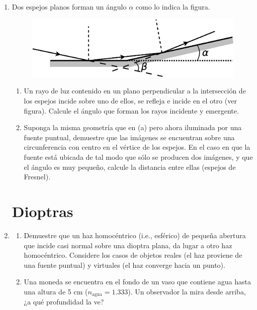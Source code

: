 \documentclass[11pt,spanish]{article}
\begin{document}
\begin{enumerate}
    
    \item Dos espejos planos forman un ángulo $\alpha$ como lo indica la figura.
    \begin{figure}[H]
        \centering{}\includegraphics[clip,scale=0.25]{figs/ej3-12}
    \end{figure}
    
    \begin{enumerate}
        \item Un rayo de luz contenido en un plano perpendicular a la
        intersección de los espejos incide sobre uno de ellos, se refleja e
        incide en el otro (ver figura). Calcule el ángulo que forman los rayos
        incidente y emergente.
    
        \item Suponga la misma geometría que en (a) pero ahora iluminada por una
        fuente puntual, demuestre que las imágenes se encuentran sobre una
        circunferencia con centro en el vértice de los espejos. En el caso
        en que la fuente está ubicada de tal modo que sólo se producen dos
        imágenes, y que el ángulo es muy pequeño, calcule la distancia entre
        ellas (espejos de Fresnel).
    \end{enumerate}
    
\section*{Dioptras}


    \item 
    \begin{enumerate}
        \item Demuestre que un haz homocéntrico (i.e., esférico) de pequeña
        abertura que incide casi normal sobre una dioptra plana, da lugar a otro
        haz homocéntrico. Considere los casos de objetos reales (el haz proviene
        de una fuente puntual) y virtuales (el haz converge hacia un punto).

        \item Una moneda se encuentra en el fondo de un vaso que contiene agua
        hasta una altura de 5 cm ($n_\text{agua}=1.333$). Un observador la mira
        desde arriba, ¿a qué profundidad la ve?


\end{enumerate}
\end{enumerate}
\end{document}
